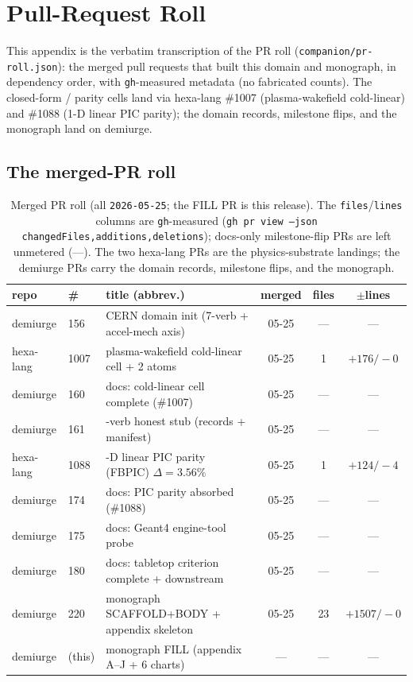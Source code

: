\section{Pull-Request Roll}
\label{app:prroll}

This appendix is the verbatim transcription of the PR roll
(\texttt{companion/\allowbreak pr-roll.json}): the merged pull requests
that built this domain and monograph, in dependency order, with
\texttt{gh}-measured metadata (no fabricated counts). The closed-form /
parity cells land via hexa-lang \#1007 (plasma-wakefield cold-linear) and
\#1088 (1-D linear PIC parity); the domain records, milestone flips, and
the monograph land on demiurge.

\subsection{The merged-PR roll}
\label{app:prroll-table}

\begin{table}[h]
\centering
\scriptsize
\setlength{\tabcolsep}{4pt}
\begin{tabular}{@{}l l >{\raggedright\arraybackslash}m{4.4cm} c c c@{}}
\toprule
repo & \# & title (abbrev.) & merged & files & $\pm$lines \\
\midrule
demiurge  & 156 & CERN domain init (7-verb + accel-mech axis) & 05-25 & --- & --- \\
hexa-lang & 1007 & plasma-wakefield cold-linear cell + 2 atoms & 05-25 & 1 & $+176/{-}0$ \\
demiurge  & 160 & docs: cold-linear cell complete (\#1007) & 05-25 & --- & --- \\
demiurge  & 161 & 4-verb honest stub (records + manifest) & 05-25 & --- & --- \\
hexa-lang & 1088 & 1-D linear PIC parity (FBPIC) $\Delta\!=\!3.56\%$ & 05-25 & 1 & $+124/{-}4$ \\
demiurge  & 174 & docs: PIC parity absorbed (\#1088) & 05-25 & --- & --- \\
demiurge  & 175 & docs: Geant4 engine-tool probe & 05-25 & --- & --- \\
demiurge  & 180 & docs: tabletop criterion complete + downstream & 05-25 & --- & --- \\
demiurge  & 220 & monograph SCAFFOLD+BODY + appendix skeleton & 05-25 & 23 & $+1507/{-}0$ \\
demiurge  & (this) & monograph FILL (appendix A--J + 6 charts) & --- & --- & --- \\
\bottomrule
\end{tabular}
\caption{Merged PR roll (all \texttt{2026-05-25}; the FILL PR is this
release). The \texttt{files}/\texttt{lines} columns are
\texttt{gh}-measured (\texttt{gh pr view --json
changedFiles,additions,deletions}); docs-only milestone-flip PRs are left
unmetered (---). The two hexa-lang PRs are the physics-substrate landings;
the demiurge PRs carry the domain records, milestone flips, and the
monograph.}
\label{tab:app-prroll}
\end{table}

